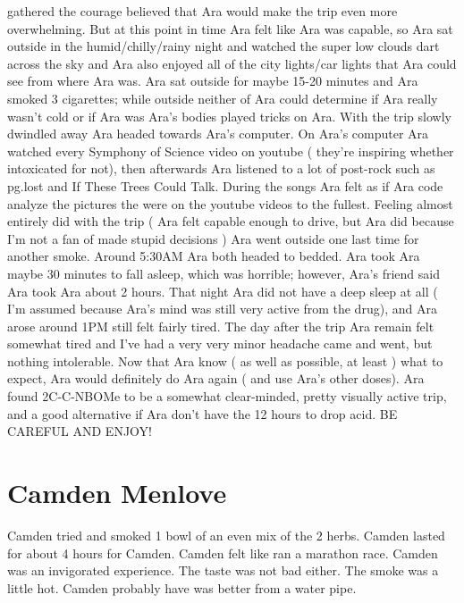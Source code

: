 \documentclass[12pt]{book}
\begin{document}
gathered the courage believed that Ara would make the trip even more overwhelming. But at this point in time Ara felt like Ara was capable, so Ara sat outside in the humid/chilly/rainy night and watched the super low clouds dart across the sky and Ara also enjoyed all of the city lights/car lights that Ara could see from where Ara was. Ara sat outside for maybe 15-20 minutes and Ara smoked 3 cigarettes; while outside neither of Ara could determine if Ara really wasn't cold or if Ara was Ara's bodies played tricks on Ara. With the trip slowly dwindled away Ara headed towards Ara's computer. On Ara's computer Ara watched every Symphony of Science video on youtube ( they're inspiring whether intoxicated for not), then afterwards Ara listened to a lot of post-rock such as pg.lost and If These Trees Could Talk. During the songs Ara felt as if Ara code analyze the pictures the were on the youtube videos to the fullest. Feeling almost entirely did with the trip ( Ara felt capable enough to drive, but Ara did because I'm not a fan of made stupid decisions ) Ara went outside one last time for another smoke. Around 5:30AM Ara both headed to bedded. Ara took Ara maybe 30 minutes to fall asleep, which was horrible; however, Ara's friend said Ara took Ara about 2 hours. That night Ara did not have a deep sleep at all ( I'm assumed because Ara's mind was still very active from the drug), and Ara arose around 1PM still felt fairly tired. The day after the trip Ara remain felt somewhat tired and I've had a very very minor headache came and went, but nothing intolerable. Now that Ara know ( as well as possible, at least ) what to expect, Ara would definitely do Ara again ( and use Ara's other doses). Ara found 2C-C-NBOMe to be a somewhat clear-minded, pretty visually active trip, and a good alternative if Ara don't have the 12 hours to drop acid. BE CAREFUL AND ENJOY!



\chapter{Camden Menlove}

Camden tried and smoked 1 bowl of an even mix of the 2 herbs. Camden lasted for about 4 hours for Camden. Camden felt like ran a marathon race. Camden was an invigorated experience. The taste was not bad either. The smoke was a little hot. Camden probably have was better from a water pipe.
\end{document}
